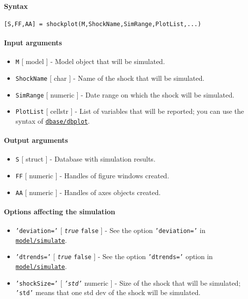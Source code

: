 


	\paragraph{Syntax}

\begin{verbatim}
[S,FF,AA] = shockplot(M,ShockName,SimRange,PlotList,...)
\end{verbatim}

\paragraph{Input arguments}

\begin{itemize}
\item
  \texttt{M} {[} model {]} - Model object that will be simulated.
\item
  \texttt{ShockName} {[} char {]} - Name of the shock that will be
  simulated.
\item
  \texttt{SimRange} {[} numeric {]} - Date range on which the shock will
  be simulated.
\item
  \texttt{PlotList} {[} cellstr {]} - List of variables that will be
  reported; you can use the syntax of
  \href{dbase/dbplot}{\texttt{dbase/dbplot}}.
\end{itemize}

\paragraph{Output arguments}

\begin{itemize}
\item
  \texttt{S} {[} struct {]} - Database with simulation results.
\item
  \texttt{FF} {[} numeric {]} - Handles of figure windows created.
\item
  \texttt{AA} {[} numeric {]} - Handles of axes objects created.
\end{itemize}

\paragraph{Options affecting the
simulation}

\begin{itemize}
\item
  \texttt{'deviation='} {[} \emph{\texttt{true}} \textbar{}
  \texttt{false} {]} - See the option \texttt{'deviation='} in
  \href{model/simulate}{\texttt{model/simulate}}.
\item
  \texttt{'dtrends='} {[} \emph{\texttt{true}} \textbar{} \texttt{false}
  {]} - See the option \texttt{'dtrends='} option in
  \href{model/simulate}{\texttt{model/simulate}}.
\item
  \texttt{'shockSize='} {[} \emph{\texttt{'std'}} \textbar{} numeric {]}
  - Size of the shock that will be simulated; \texttt{'std'} means that
  one std dev of the shock will be simulated.
\end{itemize}

